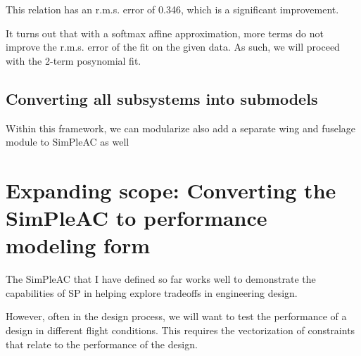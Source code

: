 This relation has an r.m.s. error of 0.346, which is a significant improvement. 

It turns out that with a softmax affine approximation, more terms do not improve the r.m.s.
error of the fit on the given data. As such, we will proceed with the 2-term posynomial fit. 




\subsection{Converting all subsystems into submodels}

Within this framework, we can modularize also add a separate wing and fuselage module to
SimPleAC as well

\section{Expanding scope: Converting the SimPleAC to performance modeling form}

The SimPleAC that I have defined so far works well to demonstrate the
capabilities of \gls{SP} in helping explore tradeoffs in engineering design.

However, often in the design process, we will want to test the performance of a
design in different flight conditions. This requires the vectorization of 
constraints that relate to the performance of the design. 